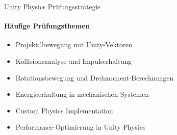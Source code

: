 \begin{KR}{Unity Physics Prüfungsstrategie}
    \paragraph{Häufige Prüfungsthemen}
    \begin{itemize}
        \item Projektilbewegung mit Unity-Vektoren
        \item Kollisionsanalyse und Impulserhaltung
        \item Rotationsbewegung und Drehmoment-Berechnungen
        \item Energieerhaltung in mechanischen Systemen
        \item Custom Physics Implementation
        \item Performance-Optimierung in Unity Physics
    \end{itemize}
\end{KR}
